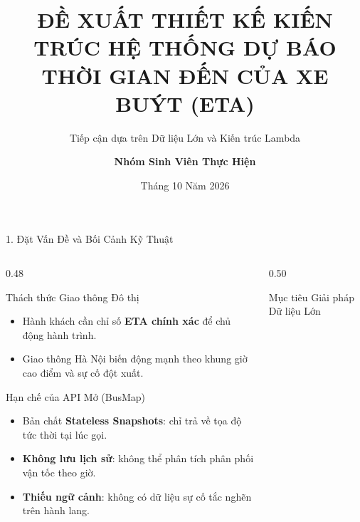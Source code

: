 \documentclass[aspectratio=169,10pt]{beamer}
\title[\textbf{Kiến trúc Dự báo ETA Xe Buýt}]{\textbf{ĐỀ XUẤT THIẾT KẾ KIẾN TRÚC HỆ THỐNG DỰ BÁO THỜI GIAN ĐẾN CỦA XE BUÝT (ETA)}}
\subtitle{Tiếp cận dựa trên Dữ liệu Lớn và Kiến trúc Lambda}
\author{\textbf{Nhóm Sinh Viên Thực Hiện}}
\institute{Đại học Bách khoa Hà Nội -- Trường Công nghệ Thông tin và Truyền thông}
\date{Tháng 10 Năm 2026}
\begin{document}
\begin{frame}[plain]
    \titlepage
\end{frame}

\begin{frame}{1. Đặt Vấn Đề và Bối Cảnh Kỹ Thuật}
\begin{columns}[T]
    \begin{column}{0.48\textwidth}
        \begin{block}{Thách thức Giao thông Đô thị}
            \begin{itemize}\setlength{\itemsep}{2pt}\footnotesize
                \item Hành khách cần chỉ số \textbf{ETA chính xác} để chủ động hành trình.
                \item Giao thông Hà Nội biến động mạnh theo khung giờ cao điểm và sự cố đột xuất.
            \end{itemize}
        \end{block}
        \vspace{2pt}
        \begin{alertblock}{Hạn chế của API Mở (BusMap)}
            \begin{itemize}\setlength{\itemsep}{2pt}\footnotesize
                \item Bản chất \textbf{Stateless Snapshots}: chỉ trả về tọa độ tức thời tại lúc gọi.
                \item \textbf{Không lưu lịch sử}: không thể phân tích phân phối vận tốc theo giờ.
                \item \textbf{Thiếu ngữ cảnh}: không có dữ liệu sự cố tắc nghẽn trên hành lang.
            \end{itemize}
        \end{alertblock}
    \end{column}

    \begin{column}{0.50\textwidth}
        \begin{exampleblock}{Mục tiêu Giải pháp Dữ liệu Lớn}
            \centering
\end{exampleblock}
\end{column}
\end{columns}
\end{frame}
\end{document}
